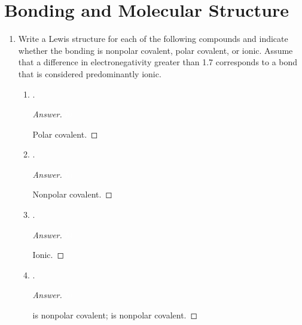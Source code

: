 \documentclass[../psets.tex]{subfiles}
\begin{document}
\section{Bonding and Molecular Structure}
\begin{enumerate}
    \item {}Write a Lewis structure for each of the following compounds and indicate whether the bonding is nonpolar covalent, polar covalent, or ionic. Assume that a difference in electronegativity greater than 1.7 corresponds to a bond that is considered predominantly ionic.
    \begin{enumerate}
        \item {}.
        \begin{proof}[Answer]
            ${\color{white}hi}$
            \begin{center}
            \end{center}
            Polar covalent.
        \end{proof}
        \item {}.
        \begin{proof}[Answer]
            ${\color{white}hi}$
            \begin{center}
            \end{center}
            Nonpolar covalent.
        \end{proof}
        \item {}.
        \begin{proof}[Answer]
            ${\color{white}hi}$
            \begin{center}
            \end{center}
            Ionic.
        \end{proof}
        \item {}.
        \begin{proof}[Answer]
            ${\color{white}hi}$
            \begin{center}
            \end{center}
             is nonpolar covalent;  is nonpolar covalent.
        \end{proof}

\end{enumerate}
\end{enumerate}
\end{document}
